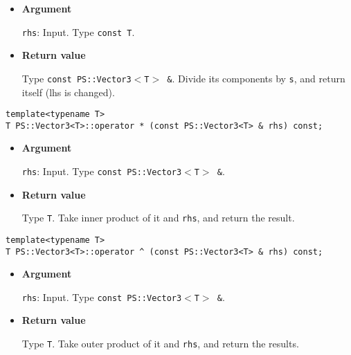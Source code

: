 \begin{itemize}

\item{{\bf Argument}}

\texttt{rhs}: Input. Type \texttt{const T}.

\item{{\bf Return value}}

Type \texttt{const PS::Vector3$<$T$>$ \&}. Divide its components by \texttt{s}, and
return itself (lhs is changed).

\end{itemize}


\mbox{}

\begin{screen}
\begin{verbatim}
template<typename T>
T PS::Vector3<T>::operator * (const PS::Vector3<T> & rhs) const;
\end{verbatim}
\end{screen}

\begin{itemize}

\item{{\bf Argument}}

\texttt{rhs}: Input. Type \texttt{const PS::Vector3$<$T$>$ \&}.

\item{{\bf Return value}}

Type \texttt{T}. Take inner product of it and \texttt{rhs}, and return the result.

\end{itemize}

\begin{screen}
\begin{verbatim}
template<typename T>
T PS::Vector3<T>::operator ^ (const PS::Vector3<T> & rhs) const;
\end{verbatim}
\end{screen}

\begin{itemize}

\item{{\bf Argument}}

\texttt{rhs}: Input. Type \texttt{const PS::Vector3$<$T$>$ \&}.

\item{{\bf Return value}}

Type \texttt{T}. Take outer product of it and \texttt{rhs}, and return the results.

\end{itemize}


